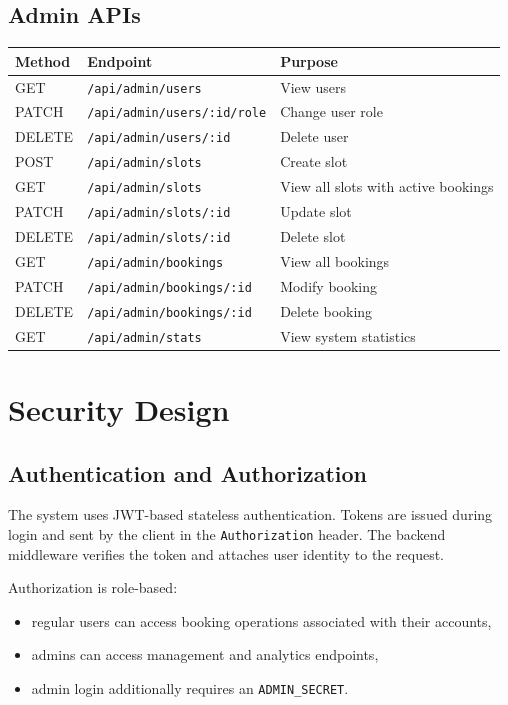\documentclass[12pt,a4paper]{article}
\begin{document}
\subsection{Admin APIs}
\begin{longtable}{p{} p{} p{}}
\toprule
\textbf{Method} & \textbf{Endpoint} & \textbf{Purpose} \\
\midrule
GET & \texttt{/api/admin/users} & View users \\
PATCH & \texttt{/api/admin/users/:id/role} & Change user role \\
DELETE & \texttt{/api/admin/users/:id} & Delete user \\
POST & \texttt{/api/admin/slots} & Create slot \\
GET & \texttt{/api/admin/slots} & View all slots with active bookings \\
PATCH & \texttt{/api/admin/slots/:id} & Update slot \\
DELETE & \texttt{/api/admin/slots/:id} & Delete slot \\
GET & \texttt{/api/admin/bookings} & View all bookings \\
PATCH & \texttt{/api/admin/bookings/:id} & Modify booking \\
DELETE & \texttt{/api/admin/bookings/:id} & Delete booking \\
GET & \texttt{/api/admin/stats} & View system statistics \\
\bottomrule
\end{longtable}

\section{Security Design}
\subsection{Authentication and Authorization}
The system uses JWT-based stateless authentication. Tokens are issued during login and sent by the client in the \texttt{Authorization} header. The backend middleware verifies the token and attaches user identity to the request.

Authorization is role-based:
\begin{itemize}
    \item regular users can access booking operations associated with their accounts,
    \item admins can access management and analytics endpoints,
    \item admin login additionally requires an \texttt{ADMIN\_SECRET}.
\end{itemize}
\end{document}
